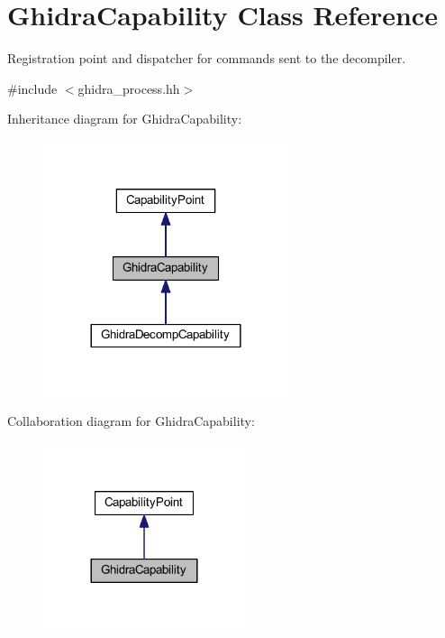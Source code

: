 \hypertarget{class_ghidra_capability}{}\section{Ghidra\+Capability Class Reference}
\label{class_ghidra_capability}


Registration point and dispatcher for commands sent to the decompiler.  




{\ttfamily \#include $<$ghidra\+\_\+process.\+hh$>$}



Inheritance diagram for Ghidra\+Capability\+:
\nopagebreak
\begin{figure}[H]
\begin{center}
\leavevmode
\includegraphics[width=204pt]{class_ghidra_capability__inherit__graph}
\end{center}
\end{figure}


Collaboration diagram for Ghidra\+Capability\+:
\nopagebreak
\begin{figure}[H]
\begin{center}
\leavevmode
\includegraphics[width=168pt]{class_ghidra_capability__coll__graph}
\end{center}
\end{figure}
